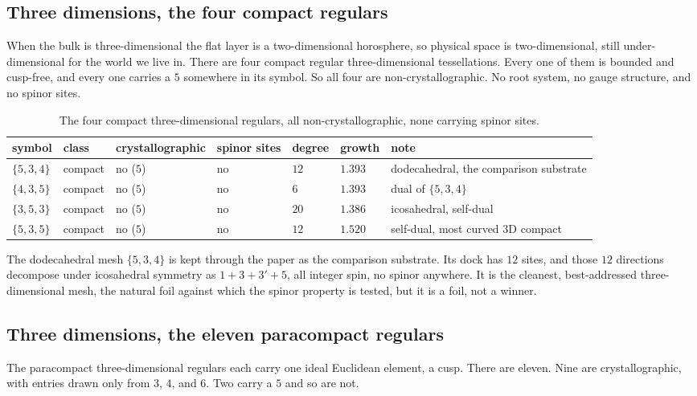 \subsection{Three dimensions, the four compact regulars}

When the bulk is three-dimensional the flat layer is a two-dimensional horosphere, so physical space is two-dimensional, still under-dimensional for the world we live in. There are four compact regular three-dimensional tessellations. Every one of them is bounded and cusp-free, and every one carries a $5$ somewhere in its symbol. So all four are non-crystallographic. No root system, no gauge structure, and no spinor sites.

\begin{table}[ht]
\centering
\begin{tabular}{@{}lllllll@{}}
\toprule
symbol & class & crystallographic & spinor sites & degree & growth & note \\
\midrule
$\{5,3,4\}$ & compact & no ($5$) & no & $12$ & $1.393$ & dodecahedral, the comparison substrate \\
$\{4,3,5\}$ & compact & no ($5$) & no & $6$ & $1.393$ & dual of $\{5,3,4\}$ \\
$\{3,5,3\}$ & compact & no ($5$) & no & $20$ & $1.386$ & icosahedral, self-dual \\
$\{5,3,5\}$ & compact & no ($5$) & no & $12$ & $1.520$ & self-dual, most curved 3D compact \\
\bottomrule
\end{tabular}
\caption{The four compact three-dimensional regulars, all non-crystallographic, none carrying spinor sites.}
\label{tab:catalog-3d-compact}
\end{table}

The dodecahedral mesh $\{5,3,4\}$ is kept through the paper as the comparison substrate. Its dock has $12$ sites, and those $12$ directions decompose under icosahedral symmetry as $1 + 3 + 3' + 5$, all integer spin, no spinor anywhere. It is the cleanest, best-addressed three-dimensional mesh, the natural foil against which the spinor property is tested, but it is a foil, not a winner.

\subsection{Three dimensions, the eleven paracompact regulars}

The paracompact three-dimensional regulars each carry one ideal Euclidean element, a cusp. There are eleven. Nine are crystallographic, with entries drawn only from $3$, $4$, and $6$. Two carry a $5$ and so are not.

